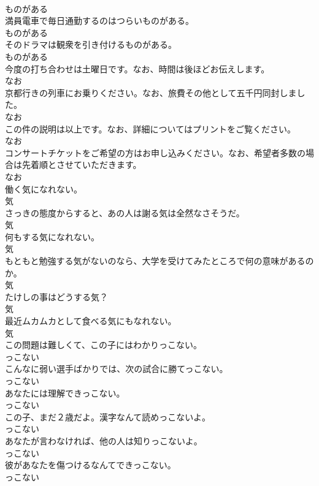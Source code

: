 \documentclass[8pt]{extreport}
\begin{document}
\begin{CJK}{UTF8}{min}
\\	ものがある
\\	満員電車で毎日通勤するのはつらいものがある。	
\\	ものがある
\\	そのドラマは観衆を引き付けるものがある。	
\\	ものがある
\\	今度の打ち合わせは土曜日です。なお、時間は後ほどお伝えします。	
\\	なお
\\	京都行きの列車にお乗りください。なお、旅費その他として五千円同封しました。	
\\	なお
\\	この件の説明は以上です。なお、詳細についてはプリントをご覧ください。	
\\	なお
\\	コンサートチケットをご希望の方はお申し込みください。なお、希望者多数の場合は先着順とさせていただきます。	
\\	なお
\\	働く気になれない。	
\\	気
\\	さっきの態度からすると、あの人は謝る気は全然なさそうだ。	
\\	気
\\	何もする気になれない。	
\\	気
\\	もともと勉強する気がないのなら、大学を受けてみたところで何の意味があるのか。	
\\	気
\\	たけしの事はどうする気？	
\\	気
\\	最近ムカムカとして食べる気にもなれない。	
\\	気
\\	この問題は難しくて、この子にはわかりっこない。	
\\	っこない
\\	こんなに弱い選手ばかりでは、次の試合に勝てっこない。	
\\	っこない
\\	あなたには理解できっこない。	
\\	っこない
\\	この子、まだ２歳だよ。漢字なんて読めっこないよ。	
\\	っこない
\\	あなたが言わなければ、他の人は知りっこないよ。	
\\	っこない
\\	彼があなたを傷つけるなんてできっこない。	
\\	っこない

\end{CJK}
\end{document}
